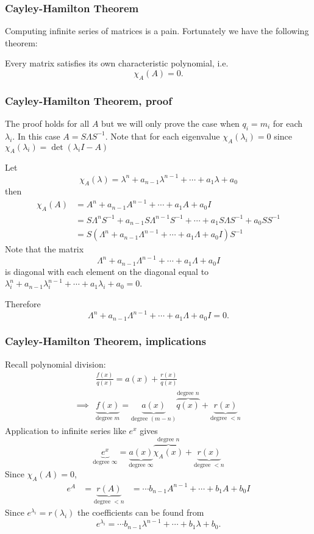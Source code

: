 \documentclass{beamer}
\begin{document}
\begin{frame}\frametitle{Cayley-Hamilton Theorem}
	Computing infinite series of matrices is a pain.  Fortunately we have
	the following theorem:
	
	\begin{theorem}
		Every matrix satisfies its own characteristic polynomial, i.e.
		\[ 
			\chi_A(A) = 0.
		\]	
	\end{theorem}
\end{frame}

\begin{frame}\frametitle{Cayley-Hamilton Theorem, proof}
	The proof holds for all $A$ but we will only prove the case when
	$q_i=m_i$ for each $\lambda_i$.  In this case $A=S\Lambda S^{-1}$.
	Note that for each eigenvalue $\chi_A(\lambda_i) = 0 $ since
	$\chi_A(\lambda_i) = \det(\lambda_i I - A)$
	
	Let \[
			\chi_A(\lambda) = \lambda^n + a_{n-1}\lambda^{n-1} + \cdots + a_1\lambda + a_0 
		\]
	then
	\begin{align*}
		\chi_A(A) &= A^n + a_{n-1}A^{n-1} + \cdots + a_1A + a_0I \\
				  &= S\Lambda^nS^{-1} + a_{n-1}S\Lambda^{n-1}S^{-1} + \cdots + a_1S\Lambda S^{-1} + a_0SS^{-1}\\
				  &= S(\Lambda^n + a_{n-1}\Lambda^{n-1} + \cdots + a_1\Lambda + a_0I)S^{-1}
	\end{align*}
	Note that the matrix 
	\[
		\Lambda^n + a_{n-1}\Lambda^{n-1} + \cdots + a_1\Lambda + a_0I
	\]
	is diagonal with each element on the diagonal equal to $\lambda_i^n +
	    a_{n-1}\lambda_i^{n-1} + \cdots + a_1\lambda_i + a_0=0$.
	  
	Therefore 
	\[
		\Lambda^n + a_{n-1}\Lambda^{n-1} + \cdots + a_1\Lambda + a_0I = 0.
	\]	
\end{frame}

\begin{frame}\frametitle{Cayley-Hamilton Theorem, implications}
	{\footnotesize
		Recall polynomial division:
		\begin{align*}
			& \frac{f(x)}{q(x)} = a(x) + \frac{r(x)}{q(x)} \\
			\implies & 
				\underbrace{f(x)}_{\text{degree $m$}} 
					=
					\underbrace{a(x)}_{\text{degree $(m-n)$}}
					\overbrace{q(x)}^{\text{degree $n$}} 
					+ \underbrace{r(x)}_{\text{degree $< n$}}
		\end{align*}
		Application to infinite series like $e^x$ gives
		\[ 
			\underbrace{e^x}_{\text{degree $\infty$}} 
				= \underbrace{a(x)}_{\text{degree $\infty$}}
				  \overbrace{\chi_A(x)}^{\text{degree $n$}} 
				  + \underbrace{r(x)}_{\text{degree $<n$}}
		\]
	}
	Since $\chi_A(A) = 0$,
	\begin{align*}
	 	e^A &= \underbrace{r(A)}_{\text{degree $< n$}}
			&= \cdots b_{n-1}A^{n-1} + \cdots + b_1A + b_0I
	\end{align*}
	Since $e^{\lambda_i} = r(\lambda_i)$ the coefficients can be found
	from
	\[ 
		e^{\lambda_i} = \cdots b_{n-1}\lambda^{n-1} + \cdots + b_1\lambda + b_0.
	\]	
\end{frame}
\end{document}
